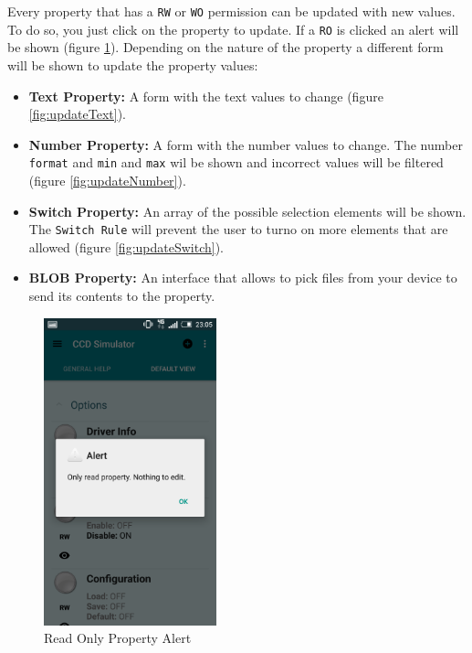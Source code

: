 Every property that has a \texttt{RW} or \texttt{WO} permission can be updated with new values. To do so, you just click on the property to update. If a \texttt{RO} is clicked an alert will be shown (figure \ref{fig:readOnly}). Depending on the nature of the property a different form will be shown to update the property values:

\begin{itemize}
  \item \textbf{Text Property:} A form with the text values to change (figure \ref{fig:updateText}).
  \item \textbf{Number Property:} A form with the number values to change. The number \texttt{format} and \texttt{min} and \texttt{max} wil be shown and incorrect values will be filtered (figure \ref{fig:updateNumber}).
  \item \textbf{Switch Property:} An array of the possible selection elements will be shown. The \texttt{Switch Rule} will prevent the user to turno on more elements that are allowed (figure \ref{fig:updateSwitch}).
  \item \textbf{BLOB Property:} An interface that allows to pick files from your device to send its contents to the property.
\end{itemize}

\begin{figure}
 \centering
 \includegraphics[width=5cm]{../images/readOnlyProperty2.png}
 \caption{Read Only Property Alert}
 \label{fig:readOnly}
\end{figure}

